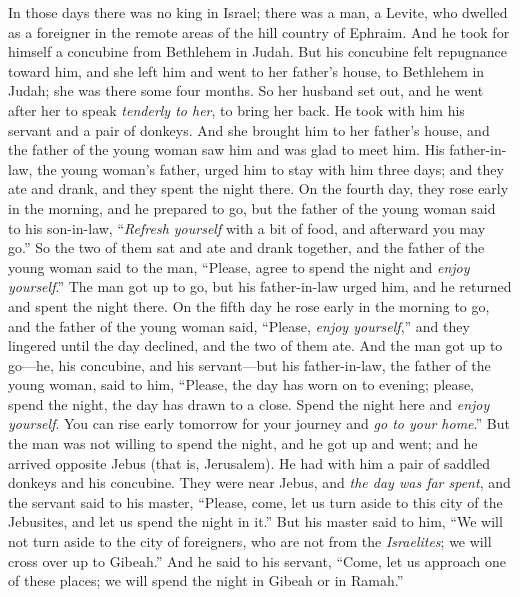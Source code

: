 \begin{biblechapter} %
 In those days there was no king in Israel; there was a man, a Levite, who dwelled as a foreigner in the remote areas of the hill country of Ephraim. And he took for himself a concubine from Bethlehem in Judah.
\verse But his concubine felt repugnance toward him, and she left him and went to her father’s house, to Bethlehem in Judah; she was there some four months.
\verse So her husband set out, and he went after her to speak \textit{tenderly to her}, to bring her back. He took with him his servant and a pair of donkeys. And she brought him to her father’s house, and the father of the young woman saw him and was glad to meet him.
\verse His father-in-law, the young woman’s father, urged him to stay with him three days; and they ate and drank, and they spent the night there.
\verse On the fourth day, they rose early in the morning, and he prepared to go, but the father of the young woman said to his son-in-law, “\textit{Refresh yourself} with a bit of food, and afterward you may go.”
\verse So the two of them sat and ate and drank together, and the father of the young woman said to the man, “Please, agree to spend the night and \textit{enjoy yourself}.”
\verse The man got up to go, but his father-in-law urged him, and he returned and spent the night there.
\verse On the fifth day he rose early in the morning to go, and the father of the young woman said, “Please, \textit{enjoy yourself},” and they lingered until the day declined, and the two of them ate.
\verse And the man got up to go—he, his concubine, and his servant—but his father-in-law, the father of the young woman, said to him, “Please, the day has worn on to evening; please, spend the night, the day has drawn to a close. Spend the night here and \textit{enjoy yourself}. You can rise early tomorrow for your journey and \textit{go to your home}.”
\verse But the man was not willing to spend the night, and he got up and went; and he arrived opposite Jebus (that is, Jerusalem). He had with him a pair of saddled donkeys and his concubine.
\verse They were near Jebus, and \textit{the day was far spent}, and the servant said to his master, “Please, come, let us turn aside to this city of the Jebusites, and let us spend the night in it.”
\verse But his master said to him, “We will not turn aside to the city of foreigners, who are not from the \textit{Israelites}; we will cross over up to Gibeah.”
\verse And he said to his servant, “Come, let us approach one of these places; we will spend the night in Gibeah or in Ramah.”

\end{biblechapter}
